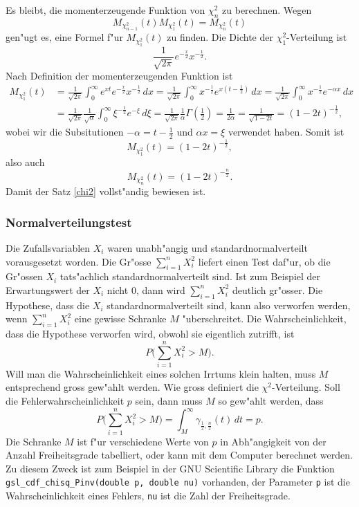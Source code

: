 {Es bleibt, die momenterzeugende Funktion von $\chi_n^2$ zu berechnen.
Wegen
\[
M_{\chi_{n-1}^2}(t)M_{\chi_1^2}(t)=M_{\chi_n^2}(t)
\]
gen"ugt es, eine Formel f"ur $M_{\chi_1^2}(t)$ zu finden. Die Dichte
der $\chi_1^2$-Verteilung ist
\[
\frac1{\sqrt{2\pi}}e^{-\frac{x}2}x^{-\frac12}.
\]
Nach Definition der momenterzeugenden Funktion ist
\begin{align*}
M_{\chi_1^2}(t)
&=\frac1{\sqrt{2\pi}}\int_0^\infty e^{xt}e^{-\frac{x}2}x^{-\frac12}\,dx
=\frac1{\sqrt{2\pi}}\int_0^\infty x^{-\frac12}e^{x(t-\frac12)}\,dx
=\frac1{\sqrt{2\pi}}\int_0^\infty x^{-\frac12}e^{-\alpha x}\,dx\\
&=\frac1{\sqrt{2\pi}}\frac1{\sqrt{\alpha}}\int_0^\infty\xi^{-\frac12}e^{-\xi}\,d\xi
=\frac1{\sqrt{2\pi}}\frac1{\alpha}\Gamma(\frac12)=\frac1{2\alpha}
=\frac1{\sqrt{1-2t}}=(1-2t)^{-\frac12},
\end{align*}
wobei wir die Subsitutionen $-\alpha=t-\frac12$ und $\alpha x=\xi$
verwendet haben. Somit ist
\[
M_{\chi_1^2}(t)=(1-2t)^{-\frac12},
\]
also auch
\[
M_{\chi_n^2}(t)=(1-2t)^{-\frac{n}2}.
\]
Damit der Satz \ref{chi2} vollst"andig bewiesen ist.

\subsubsection{Normalverteilungstest}
Die Zufallsvariablen $X_i$ waren unabh"angig und standardnormalverteilt
vorausgesetzt worden.
Die Gr"osse $\sum_{i=1}^nX_i^2$ liefert einen Test daf"ur, ob die Gr"ossen
$X_i$ tats"achlich standardnormalverteilt sind. Ist zum Beispiel der
Erwartungswert der $X_i$ nicht $0$, dann wird $\sum_{i=1}^nX_i^2$
deutlich gr"osser. Die Hypothese, dass die $X_i$ standardnormalverteilt
sind, kann also verworfen werden, wenn $\sum_{i=1}^nX_i^2$ eine gewisse
Schranke $M$ "uberschreitet. Die Wahrscheinlichkeit, dass die Hypothese
verworfen wird, obwohl sie eigentlich zutrifft, ist
\[
P\biggl(\sum_{i=1}^nX_i^2>M\biggr).
\]
Will man die Wahrscheinlichkeit eines solchen Irrtums klein halten, muss
$M$ entsprechend gross gew"ahlt werden. Wie gross definiert die
$\chi^2$-Verteilung. Soll die Fehlerwahrscheinlichkeit $p$ sein,
dann muss $M$ so gew"ahlt werden, dass 
\[
P\biggl(\sum_{i=1}^nX_i^2>M\biggr)=\int_M^\infty \gamma_{\frac12,\frac{n}2}(t)\,dt = p.
\]
Die Schranke $M$ ist f"ur verschiedene Werte von $p$ in Abh"angigkeit
von der Anzahl Freiheitsgrade tabelliert, oder kann mit dem Computer
berechnet werden.
Zu diesem Zweck ist zum Beispiel in der GNU Scientific
Library die Funktion \verb+gsl_cdf_chisq_Pinv(double p, double nu)+
vorhanden, der Parameter \verb+p+ ist die Wahrscheinlichkeit eines
Fehlers, {\tt nu} ist die Zahl der Freiheitsgrade.
}
